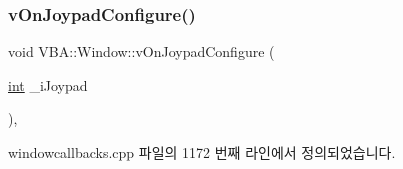\subsubsection{\texorpdfstring{v\+On\+Joypad\+Configure()}{vOnJoypadConfigure()}}
{\footnotesize\ttfamily void V\+B\+A\+::\+Window\+::v\+On\+Joypad\+Configure (\begin{DoxyParamCaption}\item[{\mbox{\hyperlink{_util_8cpp_a0ef32aa8672df19503a49fab2d0c8071}{int}}}]{\+\_\+i\+Joypad }\end{DoxyParamCaption})\hspace{0.3cm}{\ttfamily [protected]}, {\ttfamily [virtual]}}



windowcallbacks.\+cpp 파일의 1172 번째 라인에서 정의되었습니다.


